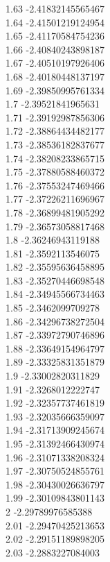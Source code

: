 {1.63	-2.41832145565467\\
1.64	-2.41501219124954\\
1.65	-2.41170584754236\\
1.66	-2.40840243898187\\
1.67	-2.40510197926406\\
1.68	-2.40180448137197\\
1.69	-2.39850995761334\\
1.7	-2.39521841965631\\
1.71	-2.39192987856306\\
1.72	-2.38864434482177\\
1.73	-2.38536182837677\\
1.74	-2.38208233865715\\
1.75	-2.37880588460372\\
1.76	-2.37553247469466\\
1.77	-2.37226211696967\\
1.78	-2.36899481905292\\
1.79	-2.36573058817468\\
1.8	-2.36246943119188\\
1.81	-2.3592113546075\\
1.82	-2.35595636458895\\
1.83	-2.35270446698548\\
1.84	-2.34945566734463\\
1.85	-2.3462099709278\\
1.86	-2.34296738272504\\
1.87	-2.33972790746896\\
1.88	-2.33649154964797\\
1.89	-2.33325831351879\\
1.9	-2.33002820311829\\
1.91	-2.3268012222747\\
1.92	-2.32357737461819\\
1.93	-2.32035666359097\\
1.94	-2.31713909245674\\
1.95	-2.31392466430974\\
1.96	-2.31071338208324\\
1.97	-2.30750524855761\\
1.98	-2.30430026636797\\
1.99	-2.30109843801143\\
2	-2.29789976585388\\
2.01	-2.29470425213653\\
2.02	-2.29151189898205\\
2.03	-2.2883227084003\\
}
